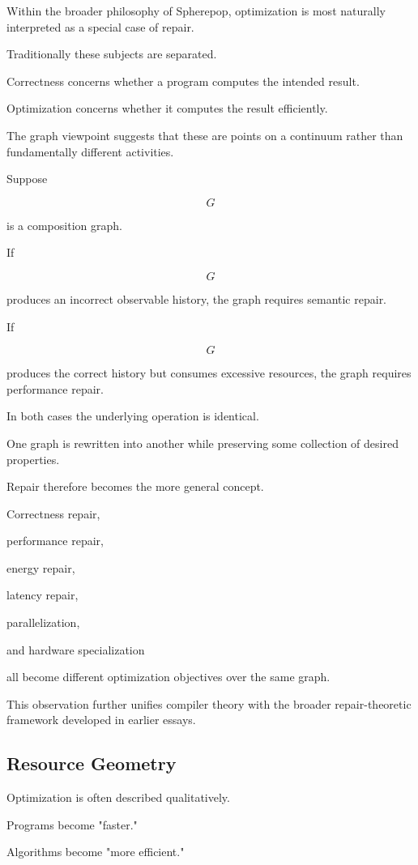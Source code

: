 \documentclass[12pt,oneside]{article}
\begin{document}
Within the broader philosophy of Spherepop, optimization is most naturally interpreted as a special case of repair.

Traditionally these subjects are separated.

Correctness concerns whether a program computes the intended result.

Optimization concerns whether it computes the result efficiently.

The graph viewpoint suggests that these are points on a continuum rather than fundamentally different activities.

Suppose

\[
G
\]

is a composition graph.

If

\[
G
\]

produces an incorrect observable history, the graph requires semantic repair.

If

\[
G
\]

produces the correct history but consumes excessive resources, the graph requires performance repair.

In both cases the underlying operation is identical.

One graph is rewritten into another while preserving some collection of desired properties.

Repair therefore becomes the more general concept.

Correctness repair,

performance repair,

energy repair,

latency repair,

parallelization,

and hardware specialization

all become different optimization objectives over the same graph.

This observation further unifies compiler theory with the broader repair-theoretic framework developed in earlier essays.

\subsection{Resource Geometry}

Optimization is often described qualitatively.

Programs become "faster."

Algorithms become "more efficient."
\end{document}
